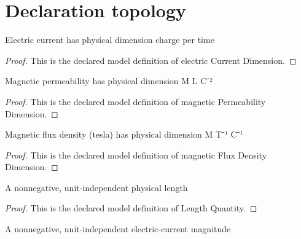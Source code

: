 \section{Declaration topology}
\begin{definition}
  \label{def:physics:phyx-mini-0960:phyxminiproblems-problemphyxmini0960-electriccurrentdimension}
  Electric current has physical dimension charge per time
\end{definition}
\begin{proof}
  This is the declared model definition of electric Current Dimension.
\end{proof}
\begin{definition}
  \label{def:physics:phyx-mini-0960:phyxminiproblems-problemphyxmini0960-magneticpermeabilitydimension}
  Magnetic permeability has physical dimension M L C⁻²
\end{definition}
\begin{proof}
  This is the declared model definition of magnetic Permeability Dimension.
\end{proof}
\begin{definition}
  \label{def:physics:phyx-mini-0960:phyxminiproblems-problemphyxmini0960-magneticfluxdensitydimension}
  Magnetic flux density (tesla) has physical dimension M T⁻¹ C⁻¹
\end{definition}
\begin{proof}
  This is the declared model definition of magnetic Flux Density Dimension.
\end{proof}
\begin{definition}
  \label{def:physics:phyx-mini-0960:phyxminiproblems-problemphyxmini0960-lengthquantity}
  A nonnegative, unit-independent physical length
\end{definition}
\begin{proof}
  This is the declared model definition of Length Quantity.
\end{proof}
\begin{definition}
  \label{def:physics:phyx-mini-0960:phyxminiproblems-problemphyxmini0960-electriccurrentmagnitude}
  A nonnegative, unit-independent electric-current magnitude
\end{definition}

